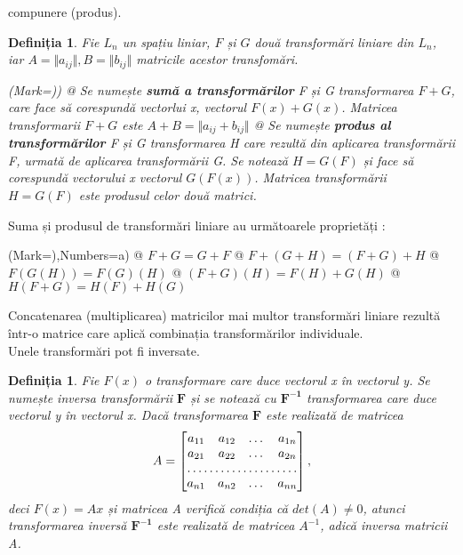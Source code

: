 compunere (produs).
\newtheorem{th_lin_tr_operations}[theorem_liniar_space]{Definiția}
\begin{th_lin_tr_operations}
Fie $\mathit{L_{n}}$ un spațiu liniar, $\mathit{F}$ și $\mathit{G}$ două
transformări liniare din $\mathit{L_{n}}$, iar $A = \Vert a_{ij} \Vert, B =
\Vert b_{ij} \Vert$ matricile acestor transfomări.
\begin{easylist}
\NewList(Mark={)})
@ Se numește \textbf{sumă a transformărilor} F și G transformarea $F + G$, care
face să corespundă vectorlui x, vectorul $F(x) + G(x)$. Matricea transformarii $F + G$
este $A + B = \Vert a_{ij} + b_{ij} \Vert$ 
@ Se numește \textbf{produs al transformărilor} F și G transformarea H care
rezultă din aplicarea transformării F, urmată de aplicarea transformării G. Se
notează $H = G(F)$ și face să corespundă vectorului x vectorul $G(F(x))$.
Matricea transformării $H = G(F)$ este produsul celor două matrici.
\end{easylist}
\end{th_lin_tr_operations}
Suma și produsul de transformări liniare au următoarele proprietăți :
\begin{easylist}
\NewList(Mark={)},Numbers=a)
@ $F + G = G + F$
@ $F + (G + H) = (F + G) + H$
@ $F(G(H)) = F(G)(H)$
@ $(F + G)(H) = F(H) + G(H)$
@ $H(F + G) = H(F) + H(G)$
\end{easylist}
Concatenarea (multiplicarea) matricilor mai multor transformări liniare rezultă
într-o matrice care aplică combinația transformărilor individuale.
\noindent
\\
Unele transformări pot fi inversate.

\newtheorem{th_tr_inverse}[theorem_liniar_space]{Definiția}
\begin{th_tr_inverse}
Fie $F(x)$ o transformare care duce vectorul \textit{x} în vectorul \textit{y}.
Se numește inversa transformării $\mathbf{F}$ și se notează cu $\mathbf{F^{-1}}$
transformarea care duce vectorul \textit{y} în vectorul \textit{x}.
Dacă transformarea $\mathbf{F}$ este realizată de matricea
\[
A = 
\begin{bmatrix}
a_{11} & a_{12} & \dots & a_{1n} \\
a_{21} & a_{22} & \dots & a_{2n} \\
\hdotsfor{4} \\
a_{n1} & a_{n2} & \dots & a_{nn}
\end{bmatrix},
\] deci $F(x) = Ax$ și matricea A verifică condiția că $det(A) \neq 0$, atunci
transformarea inversă $\mathbf{F^{-1}}$ este realizată de matricea $A^{-1}$,
adică inversa matricii A.
\end{th_tr_inverse}